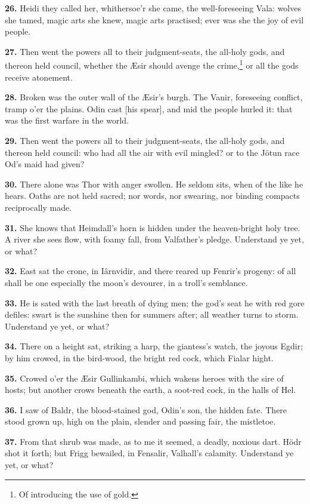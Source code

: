 \textbf{26.} Heidi they called her, whithersoe'r she came, the
well-foreseeing Vala: wolves she tamed, magic arts she knew, magic
arts practised; ever was she the joy of evil people.

\textbf{27.} Then went the powers all to their judgment-seats, the all-holy
gods, and thereon held council, whether the Æsir should avenge the
crime,\footnote{Of introducing the use of gold.} or all the gods receive atonement.

\textbf{28.} Broken was the outer wall of the Æsir's burgh. The Vanir,
foreseeing conflict, tramp o'er the plains. Odin cast [his spear], and
mid the people hurled it: that was the first warfare in the world.

\textbf{29.} Then went the powers all to their judgment-seats, the all-holy
gods, and thereon held council: who had all the air with evil mingled?
or to the Jötun race Od's maid had given?

\textbf{30.} There alone was Thor with anger swollen. He seldom sits, when
of the like he hears. Oaths are not held sacred; nor words, nor
swearing, nor binding compacts reciprocally made.

\textbf{31.} She knows that Heimdall's horn is hidden under the heaven-bright
holy tree. A river she sees flow, with foamy fall, from Valfather's
pledge. Understand ye yet, or what?

\textbf{32.} East sat the crone, in Iârnvidir, and there reared up Fenrir's
progeny: of all shall be one especially the moon's devourer, in a
troll's semblance.

\textbf{33.} He is sated with the last breath of dying men; the god's seat he
with red gore defiles: swart is the sunshine then for summers after;
all weather turns to storm. Understand ye yet, or what?

\textbf{34.} There on a height sat, striking a harp, the giantess's watch,
the joyous Egdir; by him crowed, in the bird-wood, the bright red
cock, which Fialar hight.

\textbf{35.} Crowed o'er the Æsir Gullinkambi, which wakens heroes with the
sire of hosts; but another crows beneath the earth, a soot-red cock,
in the halls of Hel.

\textbf{36.} I saw of Baldr, the blood-stained god, Odin's son, the hidden
fate. There stood grown up, high on the plain, slender and passing
fair, the mistletoe.

\textbf{37.} From that shrub was made, as to me it seemed, a deadly, noxious
dart. Hödr shot it forth; but Frigg bewailed, in Fensalir, Valhall's
calamity. Understand ye yet, or what?

